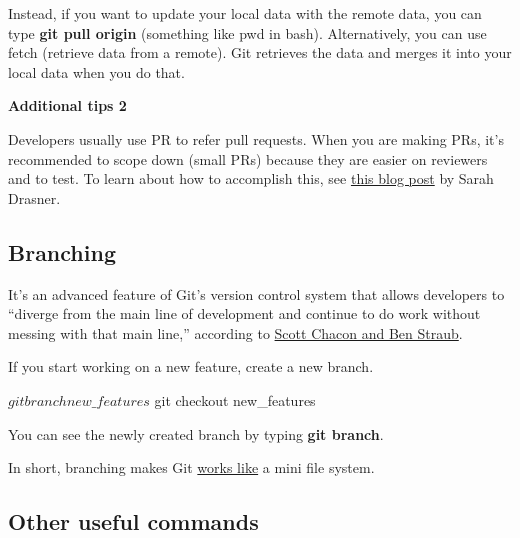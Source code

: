 \documentclass[
]{book}
\newenvironment{Shaded}{\begin{snugshade}}{\end{snugshade}}
\newcommand{\ExtensionTok}[1]{#1}
\newcommand{\NormalTok}[1]{#1}
\begin{document}
Instead, if you want to update your local data with the remote data, you can type \textbf{git pull origin} (something like pwd in bash). Alternatively, you can use fetch (retrieve data from a remote). Git retrieves the data and merges it into your local data when you do that.

\begin{Shaded}
\end{Shaded}

\textbf{Additional tips 2}

Developers usually use PR to refer pull requests. When you are making PRs, it's recommended to scope down (small PRs) because they are easier on reviewers and to test. To learn about how to accomplish this, see \href{https://www.netlify.com/blog/2020/03/31/how-to-scope-down-prs/}{this blog post} by Sarah Drasner.

\hypertarget{branching}{%
\subsection{Branching}\label{branching}}

It's an advanced feature of Git's version control system that allows developers to ``diverge from the main line of development and continue to do work without messing with that main line,'' according to \href{https://git-scm.com/book/en/v1/Git-Branching}{Scott Chacon and Ben Straub}.

If you start working on a new feature, create a new branch.

\begin{Shaded}
\begin{Highlighting}[]
\ExtensionTok{$}\NormalTok{ git branch new\_features}
\ExtensionTok{$}\NormalTok{ git checkout new\_features}
\end{Highlighting}
\end{Shaded}

You can see the newly created branch by typing \textbf{git branch}.

In short, branching makes Git \href{https://git-scm.com/book/en/v2/Getting-Started-Git-Basics}{works like} a mini file system.

\hypertarget{other-useful-commands}{%
\subsection{Other useful commands}\label{other-useful-commands}}
\end{document}
